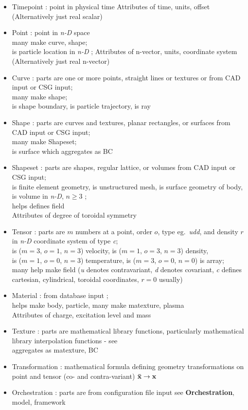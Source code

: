 \begin{itemize}
\item
  Timepoint : point in physical time Attributes of time, units, offset
  (Alternatively just real scalar)
\item
  Point : point in \emph{n-D} space\\
  many make curve, shape;\\
  is particle location in \emph{n-D} ; Attributes of n-vector, units,
  coordinate system (Alternatively just real n-vector)
\item
  Curve : parts are one or more points, straight lines or textures
  or from CAD input or CSG input;\\
  many make shape;\\
  is shape boundary, is particle trajectory, is ray
\item
  Shape : parts are curves and textures, planar rectangles, or
  surfaces from CAD input or CSG input;\\
  many make Shapeset;\\
  is surface which aggregates as BC
\item
  Shapeset : parts are shapes, regular lattice, or volumes from CAD
  input or CSG input;\\
  is finite element geometry, is unstructured mesh, is surface geometry
  of body, is volume in \emph{n-D}, $n\geq 3$ ;\\
  helps defines field\\
  Attributes of degree of toroidal symmetry
\item
  Tensor : parts are $m$ numbers at a point, order $o$, type eg.\ 
  \emph{udd}, and density $r$ in \emph{n-D} coordinate system of type
  \emph{c};\\
  is ($m=3$, $o=1$, $n=3$) velocity, is ($m=1$, $o=3$,
  $n=3$) density,\\
  is ($m=1$, $o=0$, $n=3$) temperature, is ($m=3$, $o=0$,
  $n=0$) is array;\\
  many help make field (\emph{u} denotes contravariant, \emph{d} denotes
  covariant, \emph{c} defines cartesian, cylindrical, toroidal
  coordinates, $r=0$ usually)
\item
  Material : from database input ;\\
  helps make body, particle, many make matexture, plasma\\
  Attributes of charge, excitation level and mass
\item
  Texture : parts are mathematical library functions,
  particularly  mathematical library interpolation functions - see \\
  aggregates as matexture, BC
\item
  Transformation : mathematical formula defining geometry
  transformations on point and tensor (co- and contra-variant) $\bf{\bar{x}}\rightarrow \bf{x}$
\item
  Orchestration : parts are from configuration file input see
  \textbf{Orchestration}, model, framework
\end{itemize}

